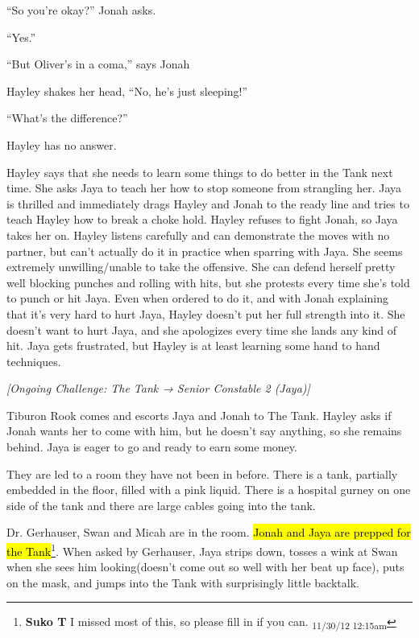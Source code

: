 ``So you're okay?'' Jonah asks.

``Yes.''

``But Oliver's in a coma,'' says Jonah

Hayley shakes her head, ``No, he's just sleeping!''

``What's the difference?''

Hayley has no answer.



Hayley says that she needs to learn some things to do better in the Tank next time.  She asks Jaya to teach her how to stop someone from strangling her.  Jaya is thrilled and immediately drags Hayley and Jonah to the ready line and tries to teach Hayley how to break a choke hold.  Hayley refuses to fight Jonah, so Jaya takes her on.  Hayley listens carefully and can demonstrate the moves with no partner, but can't actually do it in practice when sparring with Jaya.  She seems extremely unwilling/unable to take the offensive. She can defend herself pretty well blocking punches and rolling with hits, but she protests every time she's told to punch or hit Jaya.    Even when ordered to do it, and with Jonah explaining that it's very hard to hurt Jaya, Hayley doesn't put her full strength into it.  She doesn't want to hurt Jaya, and she apologizes every time she lands any kind of hit.  Jaya gets frustrated, but Hayley is at least learning some hand to hand techniques.  



\textit{{[}Ongoing Challenge: The Tank → Senior Constable 2 (Jaya){]}}



Tiburon Rook comes and escorts Jaya and Jonah to The Tank.  Hayley asks if Jonah wants her to come with him, but he doesn't say anything, so she remains behind.  Jaya is eager to go and ready to earn some money.



They are led to a room they have not been in before.  There is a tank, partially embedded in the floor, filled with a pink liquid.  There is a hospital gurney on one side of the tank and there are large cables going into the tank.



Dr. Gerhauser, Swan and Micah are in the room.  \hl{Jonah and Jaya are prepped for the Tank}\footnote{\textbf{Suko T }I missed most of this, so please fill in if you can. \textsubscript{11/30/12 12:15am}}.  When asked by Gerhauser, Jaya strips down, tosses a wink at Swan when she sees him looking(doesn't come out so well with her beat up face), puts on the mask, and jumps into the Tank with surprisingly little backtalk.  





